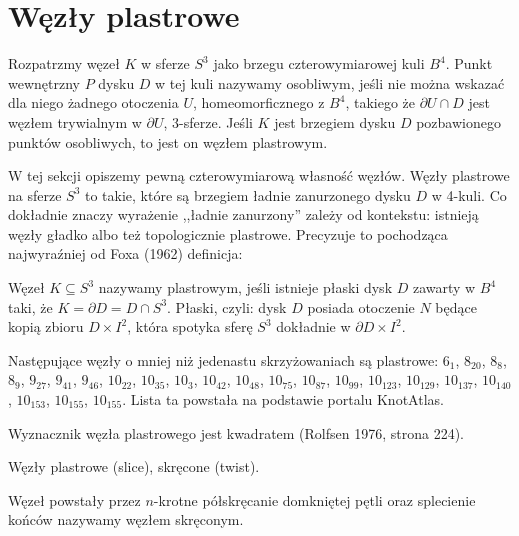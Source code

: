 \section{Węzły plastrowe} %
\label{sec:slice}
Rozpatrzmy węzeł $K$ w sferze $S^3$ jako brzegu czterowymiarowej kuli $B^4$.
Punkt wewnętrzny $P$ dysku $D$ w tej kuli nazywamy osobliwym, jeśli nie można wskazać dla niego żadnego otoczenia $U$, homeomorficznego z $B^4$, takiego że $\partial U \cap D$ jest węzłem trywialnym w $\partial U$, 3-sferze.
Jeśli $K$ jest brzegiem dysku $D$ pozbawionego punktów osobliwych, to jest on węzłem plastrowym.

W tej sekcji opiszemy pewną czterowymiarową własność węzłów.
Węzły plastrowe na sferze $S^3$ to takie, które są brzegiem ładnie zanurzonego dysku $D$ w 4-kuli.
Co dokładnie znaczy wyrażenie ,,ładnie zanurzony'' zależy od kontekstu: istnieją węzły gładko albo też topologicznie plastrowe.
Precyzuje to pochodząca najwyraźniej od Foxa (1962) definicja:

\begin{definition}
    Węzeł $K \subseteq S^3$ nazywamy plastrowym, jeśli istnieje płaski dysk $D$ zawarty w $B^4$ taki, że $K = \partial D = D \cap S^3$.
    Płaski, czyli: dysk $D$ posiada otoczenie $N$ będące kopią zbioru $D \times I^2$, która spotyka sferę $S^3$ dokładnie w $\partial D \times I^2$.
\end{definition}

Następujące węzły o mniej niż jedenastu skrzyżowaniach są plastrowe: $6_1$, $8_{20}$, $8_{8}$, $8_{9}$, $9_{27}$, $9_{41}$, $9_{46}$, $10_{22}$, $10_{35}$, $10_{3}$, $10_{42}$, $10_{48}$, $10_{75}$, $10_{87}$, $10_{99}$, $10_{123}$, $10_{129}$, $10_{137}$, $10_{140}$, $10_{153}$, $10_{155}$, $10_{155}$.
Lista ta powstała na podstawie portalu KnotAtlas.

\begin{proposition} \label{slice_square_det}
    Wyznacznik węzła plastrowego jest kwadratem (Rolfsen 1976, strona 224).
\end{proposition}

Węzły plastrowe (slice), skręcone (twist).

\begin{definition} \label{twist_knots}
    Węzeł powstały przez $n$-krotne półskręcanie domkniętej pętli oraz splecienie końców nazywamy węzłem skręconym.
\end{definition}

